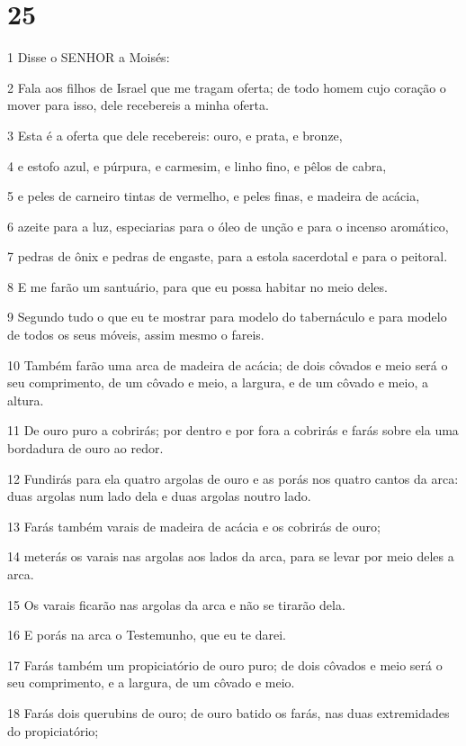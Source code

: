 \chapter{25}

\par 1 Disse o SENHOR a Moisés:
\par 2 Fala aos filhos de Israel que me tragam oferta; de todo homem cujo coração o mover para isso, dele recebereis a minha oferta.
\par 3 Esta é a oferta que dele recebereis: ouro, e prata, e bronze,
\par 4 e estofo azul, e púrpura, e carmesim, e linho fino, e pêlos de cabra,
\par 5 e peles de carneiro tintas de vermelho, e peles finas, e madeira de acácia,
\par 6 azeite para a luz, especiarias para o óleo de unção e para o incenso aromático,
\par 7 pedras de ônix e pedras de engaste, para a estola sacerdotal e para o peitoral.
\par 8 E me farão um santuário, para que eu possa habitar no meio deles.
\par 9 Segundo tudo o que eu te mostrar para modelo do tabernáculo e para modelo de todos os seus móveis, assim mesmo o fareis.
\par 10 Também farão uma arca de madeira de acácia; de dois côvados e meio será o seu comprimento, de um côvado e meio, a largura, e de um côvado e meio, a altura.
\par 11 De ouro puro a cobrirás; por dentro e por fora a cobrirás e farás sobre ela uma bordadura de ouro ao redor.
\par 12 Fundirás para ela quatro argolas de ouro e as porás nos quatro cantos da arca: duas argolas num lado dela e duas argolas noutro lado.
\par 13 Farás também varais de madeira de acácia e os cobrirás de ouro;
\par 14 meterás os varais nas argolas aos lados da arca, para se levar por meio deles a arca.
\par 15 Os varais ficarão nas argolas da arca e não se tirarão dela.
\par 16 E porás na arca o Testemunho, que eu te darei.
\par 17 Farás também um propiciatório de ouro puro; de dois côvados e meio será o seu comprimento, e a largura, de um côvado e meio.
\par 18 Farás dois querubins de ouro; de ouro batido os farás, nas duas extremidades do propiciatório;
